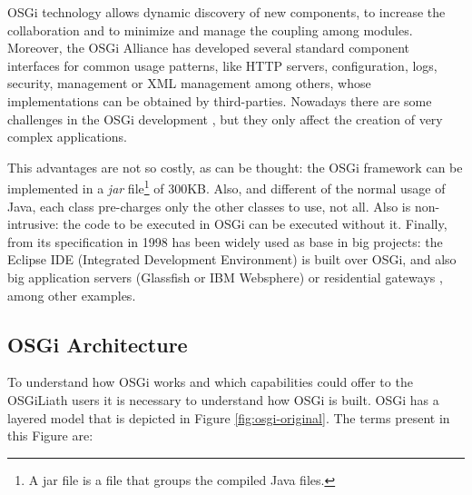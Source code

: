 \documentclass{sig-alternate}
\begin{document}
OSGi technology allows dynamic discovery of new components, to increase the collaboration and to minimize and manage the coupling
among modules. Moreover, the
OSGi Alliance has developed several standard component interfaces for
common usage patterns, like HTTP servers, configuration, logs, security,
management or XML management among others, whose implementations can
be obtained by third-parties. Nowadays there are some challenges 
in the OSGi development \cite{OSGICHALLENGES}, but they only affect the creation of very complex applications.

This advantages are not so
                               costly, as can be thought: the OSGi
                                framework can be implemented in a
                                {\em jar} file\footnote{A jar file is
                                a file that groups the compiled Java
                                files.} of 300KB. Also, and different
                                of the normal usage of Java, each
                                class pre-charges only the other
                                classes to use, not all. Also is
                                non-intrusive: the code to be
                                executed in OSGi can be executed
                                without it. Finally, from its
                                specification in 1998 has been widely
                                used as base in big projects: the
                                Eclipse IDE (Integrated Development
                                Environment) is built over OSGi, and
                                also big application servers
                               (Glassfish or IBM Websphere) or
                               residential gateways
                               \cite{OSGIGATEWAY}, among other
                               examples. 

\subsection{OSGi Architecture}
To understand how OSGi \cite{OSGI} works and which capabilities could offer to the OSGiLiath users it is necessary to understand how OSGi is built. OSGi has a layered model that is depicted in Figure \ref{fig:osgi-original}. The terms present in this Figure are:
\end{document}
